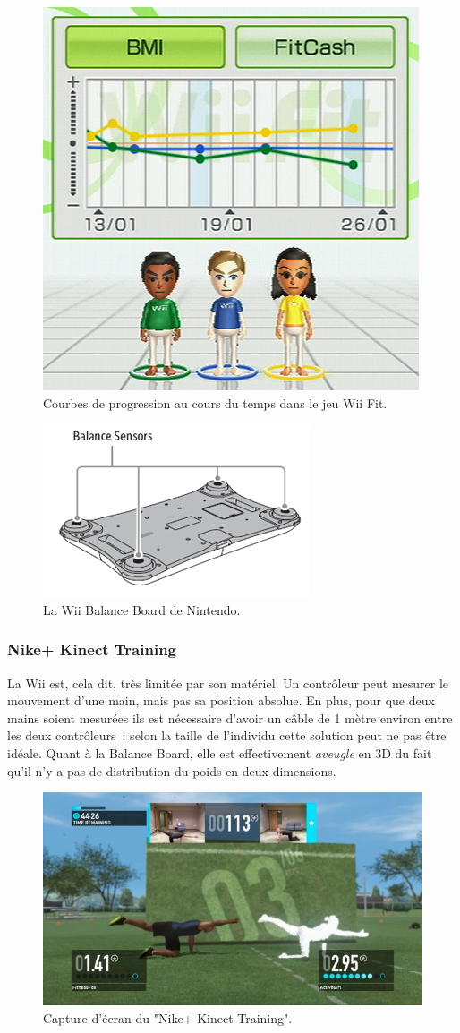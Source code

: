 \begin{figure}[h!]
\centering
\includegraphics[width=0.5\linewidth]{images/wii_fit}
\caption{Courbes de progression au cours du temps dans le jeu Wii Fit.}
\label{fig:wii_fit}
\end{figure}

\begin{figure}[h!]
\centering
\includegraphics[width=0.5\linewidth]{images/balance_board}
\caption{La Wii Balance Board de Nintendo.}
\label{fig:balance_board}
\end{figure}

\subsubsection{Nike+ Kinect Training}

La Wii est, cela dit, très limitée par son matériel. Un contrôleur peut mesurer
le mouvement d'une main, mais pas sa position absolue. En plus, pour que deux 
mains soient
mesurées ils est nécessaire d'avoir un câble de 1 mètre environ entre les deux
contrôleurs~: selon la taille de l'individu cette solution peut ne pas être
idéale. Quant à la Balance Board, elle est effectivement \textit{aveugle} en 3D du fait 
qu'il n'y a pas de distribution du poids en deux dimensions.

\begin{figure}[h!]
\centering
\includegraphics[width=0.8\linewidth]{images/nike_kinect}
\caption{Capture d'écran du "Nike+ Kinect Training".}
\end{figure}

